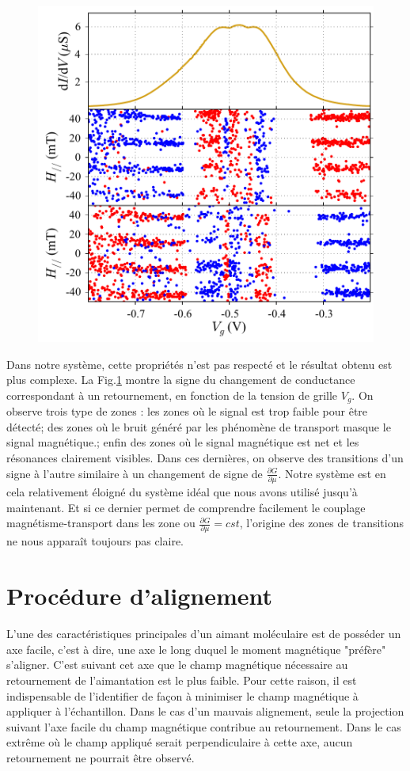 \begin{figure}
\includegraphics[scale=0.5]{Resultats/Chap1/Figure6/figure6.pdf} 
\caption{}
\label{point_fonctio}
\end{figure}

Dans notre système, cette propriétés n'est pas respecté et le résultat obtenu est plus complexe. La Fig.\ref{point_fonctio} montre la signe du changement de conductance correspondant à un retournement, en fonction de la tension de grille $V_g$. On observe trois type de zones : les zones où le signal est trop faible pour être détecté; des zones où le bruit généré par les phénomène de transport masque le signal magnétique.; enfin des zones où le signal magnétique est net et les résonances clairement visibles. Dans ces dernières, on observe des transitions d'un signe à l'autre similaire à un changement de signe de $\frac{\partial G}{\partial \mu}$. Notre système est en cela relativement éloigné du système idéal que nous avons utilisé jusqu'à maintenant. Et si ce dernier permet de comprendre facilement le couplage magnétisme-transport dans les zone ou $\frac{\partial G}{\partial \mu} = cst$, l'origine des zones de transitions ne nous apparaît toujours pas claire.

\section{Procédure d'alignement}
L'une des caractéristiques principales d'un aimant moléculaire est de posséder un axe facile, c'est à dire, une axe le long duquel le moment magnétique "préfère" s'aligner. C'est suivant cet axe que le champ magnétique nécessaire au retournement de l'aimantation est le plus faible. Pour cette raison, il est indispensable de l'identifier de façon à minimiser le champ magnétique à appliquer à l'échantillon. Dans le cas d'un mauvais alignement, seule la projection suivant l'axe facile du champ magnétique contribue au retournement. Dans le cas extrême où le champ appliqué serait perpendiculaire à cette axe, aucun retournement ne pourrait être observé.

